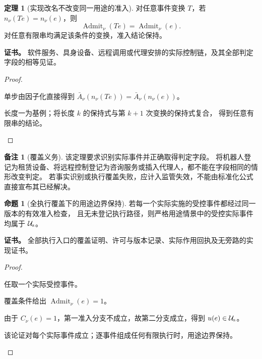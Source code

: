 \documentclass[UTF8,12pt,a4paper,openany,fontset=none,zihao=false]{ctexrep}
\theoremstyle{definition}
\newtheorem{theorem}{定理}[chapter]
\newtheorem{proposition}{命题}[chapter]
\newtheorem{remark}{备注}[chapter]
\newenvironment{certificate}{\par\noindent\textbf{证书。}\ignorespaces}{\par}
\newcommand{\1}{\mathbf 1}
\begin{document}
\begin{theorem}[实现改名不改变同一用途的准入]
\label{gov:medium-invariance}
对任意事件变换 \(T\)，若 \(n_\nu(Te)=n_\nu(e)\)，则
\[
\operatorname{Admit}_\nu(Te)=\operatorname{Admit}_\nu(e).
\]
对任意有限串均满足该条件的变换，准入结论保持。
\end{theorem}
\begin{certificate}
软件服务、具身设备、远程调用或代理安排的实际控制链，及其全部判定字段的相等见证。
\end{certificate}
\begin{proof}
\begin{semanticsteps}
\item 单步由因子化直接得到
\(\bar A_\nu(n_\nu(Te))=\bar A_\nu(n_\nu(e))\)。
\item 长度一为基例；将长度 \(k\) 的保持式与第 \(k+1\) 次变换的保持式复合，
得到任意有限串的结论。
\end{semanticsteps}
\end{proof}

\begin{remark}[覆盖义务]
该定理要求识别实际事件并正确取得判定字段。
将机器人登记为租赁设备、将远程控制登记为咨询服务或插入代理人，都不能在字段相同的情形改变判定。
若事实识别或执行覆盖失败，应计入监管失效，不能由标准化公式直接宣布其已经解决。
\end{remark}

\begin{proposition}[全执行覆盖下的用途边界保持]
\label{gov:complete-gate}
若每一个实际实施的受控事件都经过同一版本的有效准入检查，
且无未登记执行路径，则严格用途情景中的受控实际事件均属于 \(\mathcal U_{\rm s}\)。
\end{proposition}
\begin{certificate}
全部执行入口的覆盖证明、许可与版本记录、实际作用回执及无旁路的实现证书。
\end{certificate}
\begin{proof}
\begin{semanticsteps}
\item 任取一个实际受控事件。
\item 覆盖条件给出 \(\operatorname{Admit}_\nu(e)=1\)。
\item 由于 \(C_\nu(e)=1\)，第一准入分支不成立，故第二分支成立，得到 \(u(e)\in\mathcal U_{\rm s}\)。
\item 该论证对每个实际事件成立；逐事件组成任何有限执行时，用途边界保持。
\end{semanticsteps}
\end{proof}
\end{document}
